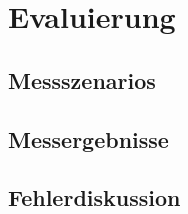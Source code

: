\chapter{Evaluierung}
\label{chap:Messergebnisse}

   
\section{Messszenarios}
\label{sec:eval_szenarios}


\section{Messergebnisse}
\label{sec:eval_ergebnisse}

\section{Fehlerdiskussion}
\label{sec:Fehlerdiskussion}


